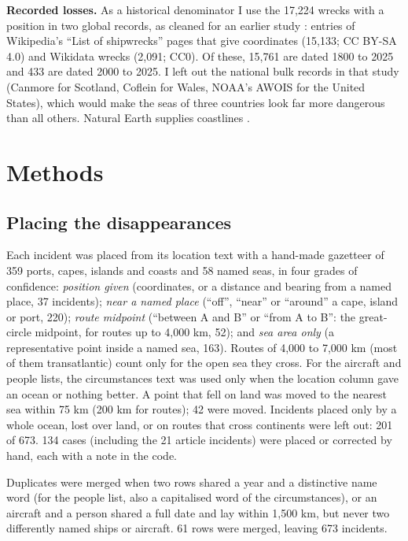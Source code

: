 \documentclass[11pt,a4paper]{article}
\begin{document}
\textbf{Recorded losses.} As a historical denominator I use the 17,224 wrecks with a position in two global records, as cleaned for an earlier study \citep{hotham}: entries of Wikipedia's ``List of shipwrecks'' pages that give coordinates (15,133; CC BY-SA 4.0) and Wikidata wrecks (2,091; CC0). Of these, 15,761 are dated 1800 to 2025 and 433 are dated 2000 to 2025. I left out the national bulk records in that study (Canmore for Scotland, Coflein for Wales, NOAA's AWOIS for the United States), which would make the seas of three countries look far more dangerous than all others. Natural Earth supplies coastlines \citep{naturalearth}.

\section{Methods}
\subsection{Placing the disappearances}
Each incident was placed from its location text with a hand-made gazetteer of 359 ports, capes, islands and coasts and 58 named seas, in four grades of confidence: \emph{position given} (coordinates, or a distance and bearing from a named place, 37 incidents); \emph{near a named place} (``off'', ``near'' or ``around'' a cape, island or port, 220); \emph{route midpoint} (``between A and B'' or ``from A to B'': the great-circle midpoint, for routes up to 4,000 km, 52); and \emph{sea area only} (a representative point inside a named sea, 163). Routes of 4,000 to 7,000 km (most of them transatlantic) count only for the open sea they cross. For the aircraft and people lists, the circumstances text was used only when the location column gave an ocean or nothing better. A point that fell on land was moved to the nearest sea within 75 km (200 km for routes); 42 were moved. Incidents placed only by a whole ocean, lost over land, or on routes that cross continents were left out: 201 of 673. 134 cases (including the 21 article incidents) were placed or corrected by hand, each with a note in the code.

Duplicates were merged when two rows shared a year and a distinctive name word (for the people list, also a capitalised word of the circumstances), or an aircraft and a person shared a full date and lay within 1,500 km, but never two differently named ships or aircraft. 61 rows were merged, leaving 673 incidents.
\end{document}
